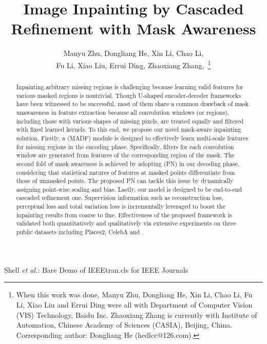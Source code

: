 \documentclass[journal]{IEEEtran}
\begin{document}
\title{Image Inpainting by {\color{black}{End-to-End}} Cascaded Refinement with Mask Awareness}


\author{Manyu Zhu,
        Dongliang He,
        Xin Li,
        Chao Li,\\
        Fu Li,
        Xiao Liu,
        Errui Ding,
        Zhaoxiang Zhang,~\thanks{When this work was done, Manyu Zhu, Dongliang He, Xin Li, Chao Li, Fu Li, Xiao Liu and Errui Ding were all with Department of Computer Vision (VIS) Technology, Baidu Inc. Zhaoxiang Zhang is currently with Institute of Automation, Chinese Academy of Sciences (CASIA), Beijing, China. Corresponding author: Dongliang He (hedlcc@126.com).}}





{Shell \MakeLowercase{\textit{et al.}}: Bare Demo of IEEEtran.cls for IEEE Journals}














\maketitle

\begin{abstract}
Inpainting arbitrary missing regions is challenging because learning valid features for various masked regions is nontrivial. Though U-shaped encoder-decoder frameworks have been witnessed to be successful, most of them share a common drawback of mask unawareness in feature extraction because all convolution windows (or regions), including those with various shapes of missing pixels, are treated equally and filtered with fixed learned kernels. To this end, we propose our novel mask-aware inpainting solution. Firstly, a {\color{black}{Mask-Aware Dynamic Filtering}} (MADF) module is designed to effectively learn multi-scale features for missing regions in the encoding phase. Specifically, filters for each convolution window are generated from features of the corresponding region of the mask. The second fold of mask awareness is achieved by adopting {\color{black}{Point-wise Normalization}} (PN) in our decoding phase, considering that statistical natures of features at masked points differentiate from those of unmasked points. The proposed PN can tackle this issue by dynamically assigning point-wise scaling {\color{black}{factor}} and bias. Lastly, our model is designed to be {\color{black}{an}} end-to-end cascaded refinement one. Supervision information such as reconstruction loss, perceptual loss and total variation loss is incrementally leveraged to boost the inpainting results from coarse to fine. Effectiveness of the proposed framework is validated both quantitatively and qualitatively via extensive experiments on three public datasets including Places2, CelebA and {\color{black}{Paris StreetView}}.    
\end{abstract}
\end{document}
